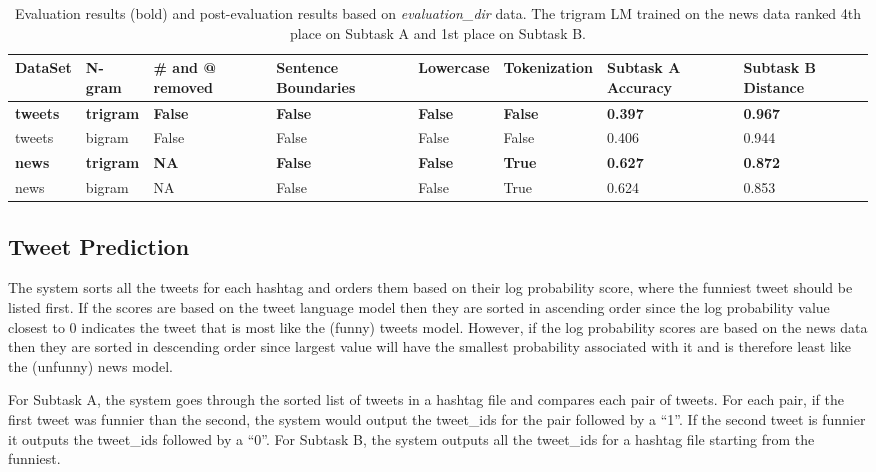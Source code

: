 \documentclass[11pt,a4paper]{article}
\begin{document}
\begin{table*}[h!]
\centering
\begin{tabular}{ |p{1.2cm}|p{1.2cm}|p{1.2cm}|p{1.7cm}|p{1.5cm}|p{1.9cm}|p{1.7cm}|p{1.7cm}|}
\hline
DataSet & N-gram & \# and @ removed  & Sentence Boundaries & Lowercase & Tokenization & Subtask A Accuracy & Subtask B Distance \\
\hline
\textbf{tweets} & \textbf{trigram} & \textbf{False} & \textbf{False} & \textbf{False} & \textbf{False} & \textbf{0.397} & \textbf{0.967} \\
\hline
tweets & bigram & False & False & False & False & 0.406 & 0.944 \\
\hline
\textbf{news} & \textbf{trigram} & \textbf{NA} & \textbf{False} & \textbf{False} & \textbf{True} & \textbf{0.627} & \textbf{0.872} \\
\hline
news & bigram & NA & False & False & True & 0.624 & 0.853 \\
\hline
\end{tabular}
\caption{Evaluation results (bold) and post-evaluation results based on \textit{evaluation\_dir} data. The trigram LM trained on the news data ranked 4th place on Subtask A and 1st place on Subtask B.}
\label{table:3}
\end{table*}

\subsection{Tweet Prediction}

The system sorts all the tweets for each hashtag and orders 
them based on their log probability
score, where the funniest tweet should be listed first. If the scores are based
on the tweet language model then they are sorted in ascending order since the
log probability value closest to 0 indicates the tweet that is most 
like the (funny) tweets model. 
However, if the log probability scores are based on the news data then they
are sorted in descending order since largest value will have the 
smallest probability associated with it and is therefore least like
the (unfunny) news model.

For Subtask A, the system goes through the sorted list of tweets in a hashtag file
and compares each pair of tweets. For each pair, if the first tweet was funnier 
than the second, the system would output the tweet\_ids for the pair 
followed by a ``1''. If the second tweet is funnier it outputs the tweet\_ids 
followed by a ``0''. For Subtask B, the system outputs all the tweet\_ids for
a hashtag file starting from the funniest. 
\end{document}

